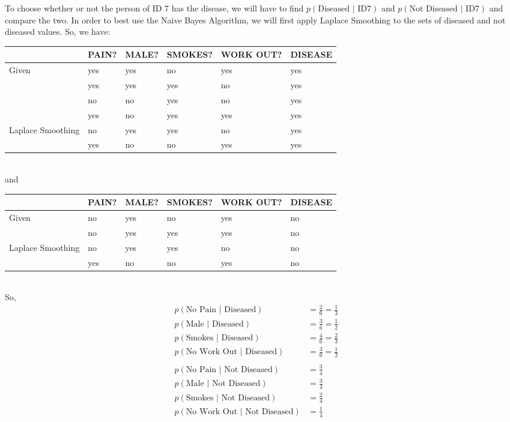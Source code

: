 \documentclass[12pt]{article} %
\begin{document}
\begin{flushleft}
To choose whether or not the person of ID $7$ has the disease, we will have to find $p(\text{Diseased $|$ ID7})$ and $p(\text{Not Diseased $|$ ID7})$ and compare the two. In order to best use the Naive Bayes Algorithm, we will first apply Laplace Smoothing to the sets of diseased and not diseased values. So, we have:
\begin{center}
\begin{tabular}{|p{2cm} | p{1.2cm} p{1.2cm} p{2cm} p{1.2cm} | p{1.8cm}|}
		\hline
		\ & PAIN? & MALE? & SMOKES? & WORK OUT? & DISEASE \\
		\hline
		Given & yes & yes & no & yes & yes \\
		\ & yes & yes & yes & no & yes \\
		\ & no & no & yes & no & yes \\
		\ & yes & no & yes & yes & yes \\
		\hline
		Laplace Smoothing & no & yes & yes & no & yes \\
		\ & yes & no & no & yes & yes \\
		\hline
\end{tabular}
\end{center}\ \\
and
\begin{center}
\begin{tabular}{|p{2cm} | p{1.2cm} p{1.2cm} p{2cm} p{1.2cm} | p{1.8cm}|}
		\hline
		\ & PAIN? & MALE? & SMOKES? & WORK OUT? & DISEASE \\
		\hline
		Given & no & yes & no & yes & no \\
		\ & no & yes & yes & yes & no \\
		\hline
		Laplace Smoothing & no & yes & yes & no & no \\
		\ & yes & no & no & yes & no \\
		\hline
\end{tabular}
\end{center}\ \\
So,
\begin{align*}
p(\text{No Pain $|$ Diseased}) &= \frac{2}{6} = \frac{1}{3}&&\\
p(\text{Male $|$ Diseased}) &= \frac{3}{6} = \frac{1}{2}&&\\
p(\text{Smokes $|$ Diseased}) &= \frac{4}{6} = \frac{2}{3}&&\\
p(\text{No Work Out $|$ Diseased}) &= \frac{3}{6} = \frac{1}{2}&&\\
&\ &&\\
p(\text{No Pain $|$ Not Diseased}) &= \frac{3}{4} &&\\
p(\text{Male $|$ Not Diseased}) &= \frac{3}{4} &&\\
p(\text{Smokes $|$ Not Diseased}) &= \frac{2}{4} &&\\
p(\text{No Work Out $|$ Not Diseased}) &= \frac{1}{4} &&\\
\end{align*}


\end{flushleft}
\end{document}
